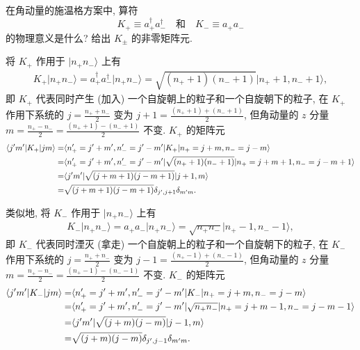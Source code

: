 \documentclass{assignment}
\begin{document}
\begin{prob}[课本习题 3.23]
    在角动量的施温格方案中, 算符
    \[
        K_+\equiv a_+^{\dagger}a_-^{\dagger}\quad\text{和}\quad K_-\equiv a_+a_-
    \]
    的物理意义是什么? 给出 $K_{\pm}$ 的非零矩阵元.
\end{prob}
\begin{sol}
    将 $K_+$ 作用于 $\lvert n_+n_-\rangle$ 上有
    \begin{align}
        K_+\lvert n_+n_-\rangle=a_+^{\dagger}a_-^{\dagger}\lvert n_+n_-\rangle=\sqrt{(n_++1)(n_-+1)}\lvert n_++1,n_-+1\rangle,
    \end{align}
    即 $K_+$ 代表同时产生 (加入) 一个自旋朝上的粒子和一个自旋朝下的粒子, 在 $K_+$ 作用下系统的 $j=\frac{n_++n_-}{2}$ 变为 $j+1=\frac{(n_++1)+(n_-+1)}{2}$, 但角动量的 $z$ 分量 $m=\frac{n_+-n_-}{2}=\frac{(n_++1)-(n_-+1)}{2}$ 不变. $K_+$ 的矩阵元
    \begin{align}
        \notag\langle j'm'\rvert K_+\lvert jm\rangle=&\langle n_+'=j'+m',n_-'=j'-m'\rvert K_+\lvert n_+=j+m,n_-=j-m\rangle\\
        \notag=&\langle n_+'=j'+m',n_-'=j'-m'\rvert\sqrt{(n_++1)(n_-+1)}\lvert n_+=j+m+1,n_-=j-m+1\rangle\\
        \notag=&\langle j'm'\rvert\sqrt{(j+m+1)(j-m+1)}\lvert j+1,m\rangle\\
        =&\sqrt{(j+m+1)(j-m+1)}\delta_{j',j+1}\delta_{m'm}.
    \end{align}

    类似地, 将 $K_-$ 作用于 $\lvert n_+n_-\rangle$ 上有
    \begin{align}
        K_-\lvert n_+n_-\rangle=a_+a_-\lvert n_+n_-\rangle=\sqrt{n_+n_-}\lvert n_+-1,n_--1\rangle,
    \end{align}
    即 $K_-$ 代表同时湮灭 (拿走) 一个自旋朝上的粒子和一个自旋朝下的粒子, 在 $K_-$ 作用下系统的 $j=\frac{n_++n_-}{2}$ 变为 $j-1=\frac{(n_+-1)+(n_--1)}{2}$, 但角动量的 $z$ 分量 $m=\frac{n_+-n_-}{2}=\frac{(n_+-1)-(n_--1)}{2}$ 不变. $K_-$ 的矩阵元
    \begin{align}
        \notag\langle j'm'\rvert K_-\lvert jm\rangle=&\langle n_+'=j'+m',n_-'=j'-m'\rvert K_-\lvert n_+=j+m,n_-=j-m\rangle\\
        \notag=&\langle n_+'=j'+m',n_-'=j'-m'\rvert\sqrt{n_+n_-}\lvert n_+=j+m-1,n_-=j-m-1\rangle\\
        \notag=&\langle j'm'\rvert\sqrt{(j+m)(j-m)}\lvert j-1,m\rangle\\
        =&\sqrt{(j+m)(j-m)}\delta_{j',j-1}\delta_{m'm}.
    \end{align}
\end{sol}
\end{document}
